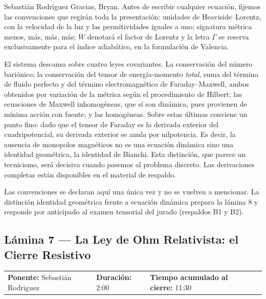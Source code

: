\documentclass[11pt,letterpaper]{article}
\makeatletter
\newcommand{\lamina}[5]{%
  \subsection*{Lámina #1 --- #2}
  \noindent
  \begin{tabular}{@{}llll@{}}
    \textbf{Ponente:} #3 &\quad \textbf{Duración:} #4 &\quad
    \textbf{Tiempo acumulado al cierre:} #5 &
  \end{tabular}
  \vspace{2pt}}
\makeatother
\begin{document}
\begin{parlamento}{Sebastián Rodriguez}
Gracias, Bryan. Antes de escribir cualquier ecuación, fijemos las
convenciones que regirán toda la presentación: unidades de
Heaviside--Lorentz, con la velocidad de la luz y las permitividades iguales a
uno; signatura métrica menos, más, más, más; $W$ denotará el factor de
Lorentz y la letra $\Gamma$ se reserva exclusivamente para el índice
adiabático, en la formulación de Valencia.

El sistema descansa sobre cuatro leyes covariantes. La conservación del
número bariónico; la conservación del tensor de energía-momento
\emph{total}, suma del término de fluido perfecto y del término
electromagnético de Faraday--Maxwell, ambos obtenidos por variación de la
métrica según el procedimiento de Hilbert; las ecuaciones de Maxwell
inhomogéneas, que sí son dinámica, pues provienen de mínima acción con
fuente; y las homogéneas. Sobre estas últimas conviene un punto fino: dado
que el tensor de Faraday es la derivada exterior del cuadripotencial, su
derivada exterior se anula por nilpotencia. Es decir, la ausencia de
monopolos magnéticos no es una ecuación dinámica sino una identidad
geométrica, la identidad de Bianchi. Esta distinción, que parece un
tecnicismo, será decisiva cuando pasemos al problema discreto. Las
derivaciones completas están disponibles en el material de respaldo.
\end{parlamento}

\begin{indicaciones}
Las convenciones se declaran aquí una única vez y no se vuelven a mencionar.
La distinción identidad geométrica frente a ecuación dinámica prepara la
lámina 8 y responde por anticipado al examen tensorial del jurado
(respaldos B1 y B2).
\end{indicaciones}

\lamina{7}{La Ley de Ohm Relativista: el Cierre Resistivo}{Sebastián Rodriguez}{2:00}{11:30}
\end{document}

